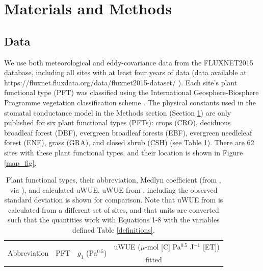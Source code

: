 \documentclass[draft,linenumbers]{agujournal}
\begin{document}
\section{Materials and Methods}
\label{methods}
\subsection{Data}
\label{data}
We use both meteorological and eddy-covariance data from the FLUXNET2015 database, including all sites with at least four years of data (data available at \sloppy https://fluxnet.fluxdata.org/data/fluxnet2015-dataset/ \sloppy). Each site's plant functional type (PFT) was classified using the International Geosphere-Biosphere Programme vegetation classification scheme \citep{Loveland_1999}. The physical constants used in the stomatal conductance model in the Methods section (Section \ref{methods}) are only published for six plant functional types (PFTs): crops (CRO), deciduous broadleaf forest (DBF), evergreen broadleaf forests (EBF), evergreen needleleaf forest (ENF), grass (GRA), and closed shrub (CSH) (see Table \ref{pft}). There are 62 sites with these plant functional types, and their location is shown in  Figure \ref{map_fig}.

\begin{table}
  \caption{Plant functional types, their abbreviation, Medlyn coefficient (from \citet{Lin_2015}, via \citet{Franks_2017}), and calculated uWUE. uWUE from \citet{Zhou_2015}, including the  observed standard deviation is shown for comparison. Note that uWUE from \citet{Zhou_2015} is calculated from a different set of sites, and that units are converted such that the quantities work with Equations 1-8 with the variables defined Table \ref{definitions}.}
    \small
\label{pft}
\centering
\begin{tabular}{l c c @{\qquad} c c}
  \hline
  \multirow{2}[3]{*}{Abbreviation} & \multirow{2}[3]{*}{PFT} & \multirow{2}[3]{*}{$g_1$ (Pa$^{0.5}$)} & \multicolumn{2}{c}{uWUE ($\mu$-mol [C] Pa$^{0.5}$ J$^{-1}$ [ET])}  \\
  \cmidrule{4-5}

  & & & fitted & \citet{Zhou_2015} \\

  \hline

  \hline
\end{tabular}
\end{table}
\end{document}
